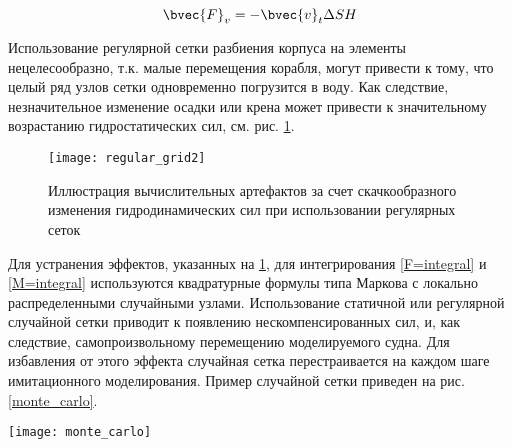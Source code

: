 \begin{equation}
	\bvec{F}_v = -\bvec{v}_t \Delta S H
\end{equation}





Использование регулярной сетки разбиения корпуса на элементы нецелесообразно, т.к. малые перемещения корабля, могут привести к тому, что целый ряд узлов сетки одновременно погрузится в воду. Как следствие, незначительное изменение осадки или крена может привести к значительному возрастанию гидростатических сил, см. рис. \ref{regular_grid}.

\begin{figure}[ht]
\begin{center}
\texttt{[image: regular\_grid2]}
\end{center}
\caption{Иллюстрация вычислительных артефактов за счет скачкообразного изменения гидродинамических сил при использовании регулярных сеток}
\label{regular_grid}
\end{figure}

Для устранения эффектов, указанных на \ref{regular_grid}, для интегрирования \eqref{F=integral} и \eqref{M=integral} используются квадратурные формулы типа Маркова с локально распределенными случайными узлами. Использование статичной или регулярной случайной сетки приводит к появлению нескомпенсированных сил, и, как следствие, самопроизвольному перемещению моделируемого судна. Для избавления от этого эффекта случайная сетка перестраивается на каждом шаге имитационного моделирования. Пример случайной сетки приведен на рис. \ref{monte_carlo}.

\begin{sidewaysfigure}[ht]
\begin{center}
\texttt{[image: monte\_carlo]}
\end{center}
\caption{Пример сетки с локально-распределенными случайными узлами}
\label{monte_carlo}
\end{sidewaysfigure}


